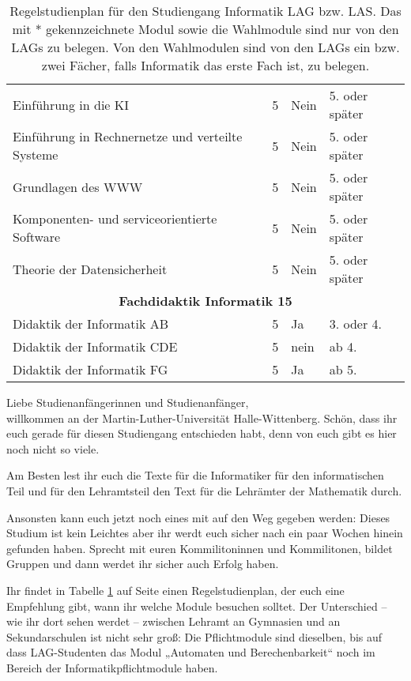 \begin{table}[tbp]
\begin{footnotesize}
\begin{tabularx}{\textwidth}{|b{}|X|X|X|}
        Einführung in die KI                             & 5 & Nein & 5. oder später \\
        Einführung in Rechnernetze und verteilte Systeme & 5 & Nein & 5. oder später \\
        Grundlagen des WWW                               & 5 & Nein & 5. oder später \\
        Komponenten- und serviceorientierte Software     & 5 & Nein & 5. oder später \\
        Theorie der Datensicherheit                      & 5 & Nein & 5. oder später \\
        \hline
        \multicolumn{4}{|c|}{\textbf{Fachdidaktik Informatik 15}}\\\hline
        Didaktik der Informatik AB  & 5 & Ja   & 3. oder 4. \\
        Didaktik der Informatik CDE & 5 & nein & ab 4. \\
        Didaktik der Informatik FG  & 5 & Ja   & ab 5. \\
        \hline
    \end{tabularx}
    \end{footnotesize}
    \caption{\label{plan-laI}Regelstudienplan für den Studiengang Informatik LAG bzw. LAS. Das mit * gekennzeichnete Modul sowie die Wahlmodule sind nur von den LAGs zu belegen. Von den Wahlmodulen sind von den LAGs ein bzw. zwei Fächer, falls Informatik das erste Fach ist, zu belegen.}
\end{table}

Liebe Studienanfängerinnen und Studienanfänger,\\
willkommen an der Martin-Luther-Universität Halle-Wittenberg.
Schön, dass ihr euch gerade für diesen Studiengang entschieden habt, denn von euch gibt es hier noch nicht so viele.

Am Besten lest ihr euch die Texte für die Informatiker für den informatischen Teil und für den Lehramtsteil den Text für die Lehrämter der Mathematik durch.

Ansonsten kann euch jetzt noch eines mit auf den Weg gegeben werden:
Dieses Studium ist kein Leichtes aber ihr werdt euch sicher nach ein paar Wochen hinein gefunden haben.
Sprecht mit euren Kommilitoninnen und Kommilitonen, bildet Gruppen und dann werdet ihr sicher auch Erfolg haben.

Ihr findet in Tabelle \ref{plan-laI} auf Seite \pageref{plan-laI} einen Regelstudienplan, der euch eine Empfehlung gibt, wann ihr welche Module besuchen solltet.
Der Unterschied  -- wie ihr dort sehen werdet -- zwischen Lehramt an Gymnasien und an Sekundarschulen ist nicht sehr groß:
Die Pflichtmodule sind dieselben, bis auf dass LAG-Studenten das Modul „Automaten und Berechenbarkeit“ noch im Bereich der Informatikpflichtmodule haben.

